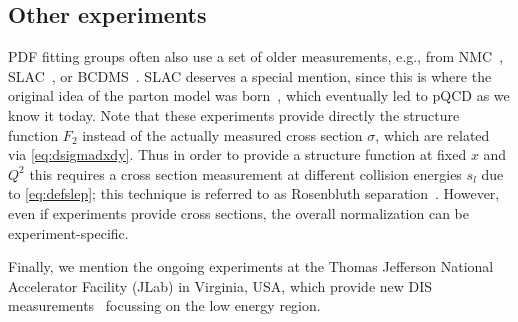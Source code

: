 \subsection{Other experiments}
PDF fitting groups often also use a set of older measurements, e.g., from NMC~\cite{NewMuon:1996uwk,NewMuon:1996fwh}, SLAC~\cite{Whitlow:1991uw}, or BCDMS~\cite{BCDMS:1989qop}.
SLAC deserves a special mention, since this is where the original idea of the parton model was born~\cite{Bloom:1969kc,Feynman:1969wa,Bjorken:1968dy,Bjorken:1969ja}, which eventually led to pQCD as we know it today.
Note that these experiments provide directly the structure function $F_2$ instead of the actually measured cross section $\sigma$, which are related via \cref{eq:dsigmadxdy}.
Thus in order to provide a structure function at fixed $x$ and $Q^2$ this requires a cross section measurement at different collision energies $s_l$ due to \cref{eq:defslep}; this technique is referred to as Rosenbluth separation~\cite{Rosenbluth:1950yq}.
However, even if experiments provide cross sections, the overall normalization can be experiment-specific.

Finally, we mention the ongoing experiments at the Thomas Jefferson National Accelerator Facility (JLab) in Virginia, USA, which provide new DIS measurements~\cite{Accardi:2026hdv} focussing on the low energy region.

